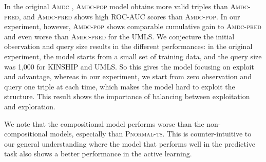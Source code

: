In the original \textsc{Amdc} \cite{kajino2015active}, \textsc{Amdc-pop} model obtains more
valid triples than \textsc{Amdc-pred}, and \textsc{Amdc-pred} shows high ROC-AUC scores than \textsc{Amdc-pop}.
In our experiment, however, \textsc{Amdc-pop} shows comparable cumulative gain to \textsc{Amdc-pred}
and even worse than \textsc{Amdc-pred} for the UMLS. We conjecture the initial observation and query size results in the different performances: in the original experiment, the model starts
from a small set of training data, and the query size was 1,000 for KINSHIP and UMLS. So this gives the model focusing on exploit and advantage,
whereas in our experiment, we start from zero
observation and query one triple at each time, which makes the model hard to exploit the structure. This result shows
the importance of balancing between exploitation and exploration.


We note that the compositional model performs worse than the non-compositional models,
especially than \textsc{Pnormal-ts}.
This is counter-intuitive to our general understanding where
the model that performs well in the predictive task also shows
a better performance in the active learning.

